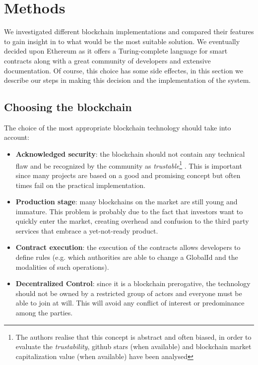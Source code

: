 \section{Methods}
\label{S:4}

We investigated different blockchain implementations and compared their features to gain insight in to what would be the most suitable solution. We eventually decided upon Ethereum as it offers a Turing-complete language for smart contracts along with a great community of developers and extensive documentation. Of course, this choice has some side effectes, in this section we describe our steps in making this decision and the implementation of the system.  

\subsection{Choosing the blockchain}

The choice of the most appropriate blockchain technology should take into account:
\begin{itemize}
  \item \textbf{Acknowledged security}: the blockchain should not contain any technical flaw and be recognized by the community as \textit{trustable}\footnote{The authors realise that this concept is abstract and often biased, in order to evaluate the \textit{trustability}, github stars (when available) and blockchain market capitalization value (when available) have been analysed} . This is important since many projects are based on a good and promising concept but often times fail on the practical implementation.
  \item \textbf{Production stage}: many blockchains on the market are still young and immature. This problem is probably due to the fact that investors want to quickly enter the market, creating overhead and confusion to the third party services that embrace a yet-not-ready product.
  \item \textbf{Contract execution}: the execution of the contracts allows developers to define rules (e.g. which authorities are able to change a GlobalId and the modalities of such operations).
  \item \textbf{Decentralized Control}: since it is a blockchain prerogative, the technology should not be owned by a restricted group of actors and everyone must be able to join at will. This will avoid any conflict of interest or predominance among the parties.
\end{itemize}

